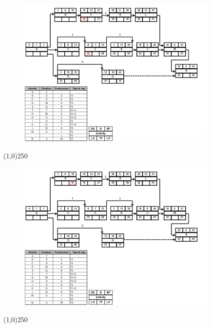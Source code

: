 \begin{frame}
\begin{figure}
	\centering
		\includegraphics[width = 10.0cm]{oldnotes/Slide232.jpg}
\end{figure}
\end{frame}
\begin{center}\line(1,0){250}\end{center}




\begin{frame}
\begin{figure}
	\centering
		\includegraphics[width = 10.0cm]{oldnotes/Slide233.jpg}
\end{figure}
\end{frame}
\begin{center}\line(1,0){250}\end{center}




